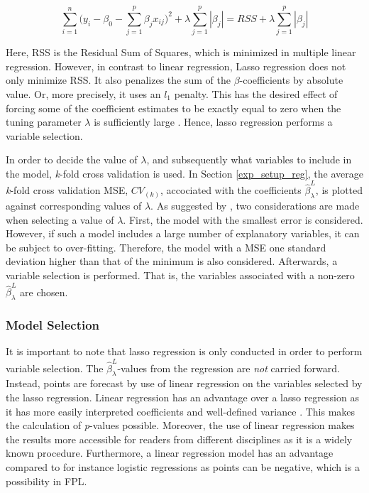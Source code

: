 \begin{equation}
    \sum_{i=1}^n\Big (y_i-\beta_0-\sum_{j=1}^p\beta_jx_{ij}\Big)^2 + \lambda \sum_{j=1}^p|\beta_j| = RSS + \lambda \sum_{j=1}^p|\beta_j|
    \label{eq:lasso}
\end{equation}

Here, RSS is the Residual Sum of Squares, which is minimized in multiple linear regression. However, in contrast to linear regression, Lasso regression does not only minimize RSS. It also penalizes the sum of the $\beta$-coefficients by absolute value. Or, more precisely, it uses an $l_1$ penalty. This has the desired effect of forcing some of the coefficient estimates to be exactly equal to zero when the tuning parameter $\lambda$ is sufficiently large \citep{ISLR}. Hence, lasso regression performs a variable selection.

\newpar 

In order to decide the value of $\lambda$, and subsequently what variables to include in the model, \textit{k}-fold cross validation is used. In Section \ref{exp_setup_reg}, the average \textit{k}-fold cross validation MSE, $CV_{(k)}$, accociated with the coefficients $\hat{\beta}_{\lambda}^{L}$, is plotted against corresponding values of $\lambda$. As suggested by \cite{ISLR}, two considerations are made when selecting a value of $\lambda$. First, the model with the smallest error is considered. However, if such a model includes a large number of explanatory variables, it can be subject to over-fitting. Therefore, the model with a MSE one standard deviation higher than that of the minimum is also considered. Afterwards, a variable selection is performed. That is, the variables associated with a non-zero $\hat{\beta}_{\lambda}^{L}$ are chosen. 

\subsubsection{Model Selection}

It is important to note that lasso regression is only conducted in order to perform variable selection. The  $\hat{\beta}_{\lambda}^{L}$-values from the regression are \textit{not} carried forward. Instead, points are forecast by use of linear regression on the variables selected by the lasso regression. Linear regression has an advantage over a lasso regression as it has more easily interpreted coefficients and well-defined variance \citep{ISLR}. This makes the calculation of \textit{p}-values possible. Moreover, the use of linear regression makes the results more accessible for readers from different disciplines as it is a widely known procedure. Furthermore, a linear regression model has an advantage compared to for instance logistic regressions as points can be negative, which is a possibility in FPL.

